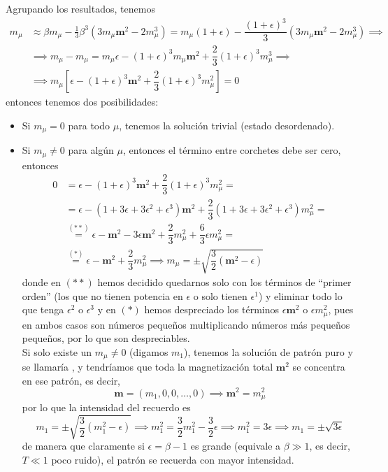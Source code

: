 Agrupando los resultados, tenemos
\begin{align*}
    m_{\mu} &\approx \beta m_{\mu} - \frac{1}{3}\beta^3 (3m_{\mu} \mathbf{m}^2 - 2m_{\mu}^3)= m_{\mu}(1+\epsilon)- \dfrac{(1+\epsilon)^3}{3}(3m_{\mu} \mathbf{m}^2 - 2m_{\mu}^3)\implies\\
    &\implies m_{\mu}-m_{\mu}=m_{\mu}\epsilon - (1+\epsilon)^3 m_{\mu} \mathbf{m}^2 + \dfrac{2}{3}(1+\epsilon)^3 m_{\mu}^3 \implies \\
    &\implies m_{\mu} \left[ \epsilon - (1+\epsilon)^3 \mathbf{m}^2 + \dfrac{2}{3}(1+\epsilon)^3 m_{\mu}^2 \right] = 0
\end{align*}
entonces tenemos dos posibilidades:
\begin{itemize}
    \item Si $m_{\mu} = 0$ para todo $\mu$, tenemos la solución trivial (estado desordenado).
    \item Si $m_{\mu} \neq 0$ para algún $\mu$, entonces el término entre corchetes debe ser cero, entonces
    \begin{align*}
        0&=\epsilon - (1+\epsilon)^3 \mathbf{m}^2 + \dfrac{2}{3}(1+\epsilon)^3 m_{\mu}^2=\\
        &= \epsilon - (1 + 3\epsilon + 3\epsilon^2 + \epsilon^3) \mathbf{m}^2 + \dfrac{2}{3}(1 + 3\epsilon + 3\epsilon^2 + \epsilon^3) m_{\mu}^2 =\\
        &\overset{(**)}{=} \epsilon - \mathbf{m}^2 -3\epsilon \mathbf{m}^2  + \dfrac{2}{3}m_{\mu}^2 +\dfrac{6}{3}\epsilon m_{\mu}^2 =\\
        &\overset{(*)}{=} \epsilon - \mathbf{m}^2 + \dfrac{2}{3}m_{\mu}^2 \implies m_{\mu}=\pm \sqrt{\dfrac{3}{2}(\mathbf{m}^2 - \epsilon)}
    \end{align*}
    donde en $(**)$ hemos decidido quedarnos solo con los términos de ``primer orden'' (los que no tienen potencia en $\epsilon$ o solo tienen $\epsilon^1$) y eliminar todo lo que tenga $\epsilon^2$ o $\epsilon^3$  y en $(*)$ hemos despreciado los términos $\epsilon \mathbf{m}^2$ o $\epsilon m_\mu^2$, pues en ambos casos son números pequeños multiplicando números más pequeños pequeños, por lo que son despreciables. \\

    \noindent
    Si solo existe un $m_{\mu} \neq 0$ (digamos $m_1$), tenemos la solución de patrón puro y se llamaría , y tendríamos que toda la magnetización total $\mathbf{m}^2$ se concentra en ese patrón, es decir, 
    \begin{equation*}
        \mathbf{m}=(m_1,0,0,\ldots,0) \implies \mathbf{m}^2 = m_\mu^2
    \end{equation*}
    por lo que la intensidad del recuerdo es
    \begin{equation*}
        m_1 = \pm \sqrt{\dfrac{3}{2}(m_1^2 - \epsilon)} \implies m_1^2 = \dfrac{3}{2} m_1^2 - \dfrac{3}{2}\epsilon \implies m_1^2 =3\epsilon \implies m_1 = \pm \sqrt{3\epsilon}
    \end{equation*}
    de manera que claramente si $\epsilon =\beta-1$ es grande (equivale a $\beta\gg 1$, es decir, $T\ll 1$ poco ruido), el patrón se recuerda con mayor intensidad.
\end{itemize}
